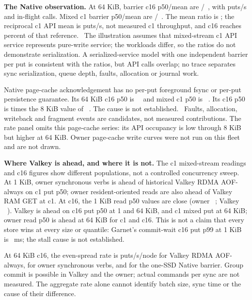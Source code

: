 \textbf{The Native observation.} At 64 KiB, barrier c16 p50/mean are /~\us, with  puts/s and  in-flight calls. Mixed c1 barrier p50/mean are /~\us. The mean ratio is ; the reciprocal c1 API mean is  puts/s, not measured c1 throughput, and c16 reaches  percent of that reference. \inference\ The illustration assumes that mixed-stream c1 API service represents pure-write service; the workloads differ, so the ratios do not demonstrate serialization. A serialized-service model with one independent barrier per put is consistent with the ratios, but API calls overlap; no trace separates sync serialization, queue depth, faults, allocation or journal work.

Native page-cache acknowledgement has no per-put foreground fsync or per-put persistence guarantee. Its 64 KiB c16 p50 is ~\us\ and mixed c1 p50 is ~\us. Its c16 p50 is  times the 8 KiB value of ~\us. The cause is not established. \inference\ Faults, allocation, writeback and fragment events are candidates, not measured contributions. The rate panel omits this page-cache series: its API occupancy is low through 8 KiB but higher at 64 KiB. Owner page-cache write curves were not run on this fleet and are not drawn.

\textbf{Where Valkey is ahead, and where it is not.} The c1 mixed-stream readings and c16 figures show different populations, not a controlled concurrency sweep. At 1 KiB, owner synchronous verbs is ahead of historical Valkey RDMA AOF-always on c1 put p50; owner resident-oriented reads are also ahead of Valkey RAM GET at c1. At c16, the 1 KiB read p50 values are close (owner ~\us; Valkey ~\us). Valkey is ahead on c16 put p50 at 1 and 64 KiB, and c1 mixed put at 64 KiB; owner read p50 is ahead at 64 KiB for c1 and c16. This is not a claim that every store wins at every size or quantile: Garnet's commit-wait c16 put p99 at 1 KiB is ~ms; the stall cause is not established.

At 64 KiB c16, the even-spread rate is  puts/s/node for Valkey RDMA AOF-always,  for owner synchronous verbs, and  for the one-SSD Native barrier. Group commit is possible in Valkey and the owner; actual commands per sync are not measured. The aggregate rate alone cannot identify batch size, sync time or the cause of their difference.

